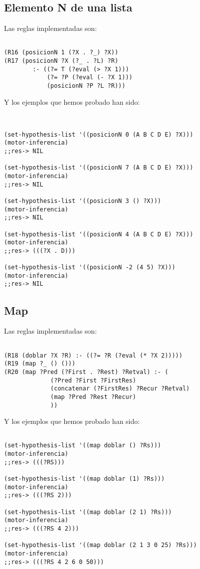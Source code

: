 \documentclass[nochap]{apuntes}
\begin{document}
\subsection*{Elemento N de una lista}
Las reglas implementadas son:\\
\begin{lstlisting}[frame=single]

(R16 (posicionN 1 (?X . ?_) ?X))
(R17 (posicionN ?X (?_ . ?L) ?R) 
		:- ((?= T (?eval (> ?X 1)))
			(?= ?P (?eval (- ?X 1)))
			(posicionN ?P ?L ?R)))
\end{lstlisting}
Y los ejemplos que hemos probado han sido:\\


\begin{lstlisting}[frame=single]


(set-hypothesis-list '((posicionN 0 (A B C D E) ?X)))
(motor-inferencia)
;;res-> NIL

(set-hypothesis-list '((posicionN 7 (A B C D E) ?X)))
(motor-inferencia)
;;res-> NIL

(set-hypothesis-list '((posicionN 3 () ?X)))
(motor-inferencia)
;;res-> NIL

(set-hypothesis-list '((posicionN 4 (A B C D E) ?X)))
(motor-inferencia)
;;res-> (((?X . D)))

(set-hypothesis-list '((posicionN -2 (4 5) ?X)))
(motor-inferencia)
;;res-> NIL
\end{lstlisting}

\subsection*{Map}
Las reglas implementadas son:\\
\begin{lstlisting}[frame=single]

(R18 (doblar ?X ?R) :- ((?= ?R (?eval (* ?X 2)))))
(R19 (map ?_ () ()))
(R20 (map ?Pred (?First . ?Rest) ?Retval) :- (
			 (?Pred ?First ?FirstRes)
			 (concatenar (?FirstRes) ?Recur ?Retval)
			 (map ?Pred ?Rest ?Recur)
			 ))
\end{lstlisting}
Y los ejemplos que hemos probado han sido:\\


\begin{lstlisting}[frame=single]

(set-hypothesis-list '((map doblar () ?Rs)))
(motor-inferencia)
;;res-> (((?RS)))

(set-hypothesis-list '((map doblar (1) ?Rs)))
(motor-inferencia)
;;res-> (((?RS 2)))

(set-hypothesis-list '((map doblar (2 1) ?Rs)))
(motor-inferencia)
;;res-> (((?RS 4 2)))

(set-hypothesis-list '((map doblar (2 1 3 0 25) ?Rs)))
(motor-inferencia)
;;res-> (((?RS 4 2 6 0 50)))
\end{lstlisting}
\end{document}
